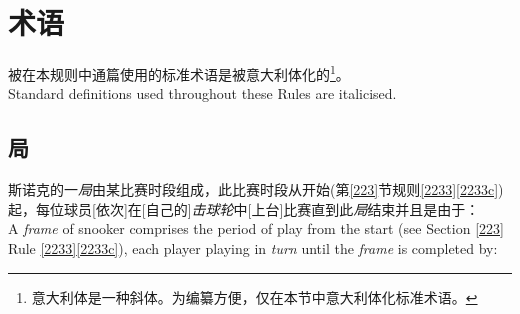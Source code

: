 \section{术语}\label{222}

\noindent 被在本规则中通篇使用的标准术语是被意大利体化的\footnote{意大利体是一种斜体。为编纂方便，仅在本节中意大利体化标准术语。}。\\
Standard definitions used throughout these Rules are italicised.

\subsection{局}\label{2221}

\noindent 斯诺克的一\textit{局}由某比赛时段组成，此比赛时段从开始(\see{}第\ref{223}节规则\ref{2233}\ref{2233c})起，每位球员[依次]在[自己的]\textit{击球轮}中[上台]比赛直到此\textit{局}结束并且是由于：\\
A \textit{frame} of snooker comprises the period of play from the start (see Section \ref{223} Rule \ref{2233}\ref{2233c}), each player playing in \textit{turn} until the \textit{frame} is completed by:
